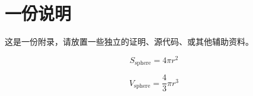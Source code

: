 \chapter*{一份说明}

这是一份附录，请放置一些独立的证明、源代码、或其他辅助资料。

\begin{equation}
    S_{\text{sphere}} = 4 \pi r^2
\end{equation}

\begin{equation}
    V_{\text{sphere}} = \frac43 \pi r^3
\end{equation}